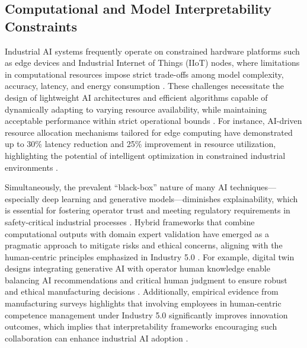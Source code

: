 \documentclass[sigconf]{acmart}
\begin{document}
\subsection{Computational and Model Interpretability Constraints}

Industrial AI systems frequently operate on constrained hardware platforms such as edge devices and Industrial Internet of Things (IIoT) nodes, where limitations in computational resources impose strict trade-offs among model complexity, accuracy, latency, and energy consumption \cite{ref2,ref31}. These challenges necessitate the design of lightweight AI architectures and efficient algorithms capable of dynamically adapting to varying resource availability, while maintaining acceptable performance within strict operational bounds \cite{ref31,ref34}. For instance, AI-driven resource allocation mechanisms tailored for edge computing have demonstrated up to 30\% latency reduction and 25\% improvement in resource utilization, highlighting the potential of intelligent optimization in constrained industrial environments \cite{ref31}.

Simultaneously, the prevalent ``black-box'' nature of many AI techniques—especially deep learning and generative models—diminishes explainability, which is essential for fostering operator trust and meeting regulatory requirements in safety-critical industrial processes \cite{ref2,ref34}. Hybrid frameworks that combine computational outputs with domain expert validation have emerged as a pragmatic approach to mitigate risks and ethical concerns, aligning with the human-centric principles emphasized in Industry 5.0 \cite{ref2,ref14}. For example, digital twin designs integrating generative AI with operator human knowledge enable balancing AI recommendations and critical human judgment to ensure robust and ethical manufacturing decisions \cite{ref2}. Additionally, empirical evidence from manufacturing surveys highlights that involving employees in human-centric competence management under Industry 5.0 significantly improves innovation outcomes, which implies that interpretability frameworks encouraging such collaboration can enhance industrial AI adoption \cite{ref14}.
\end{document}

